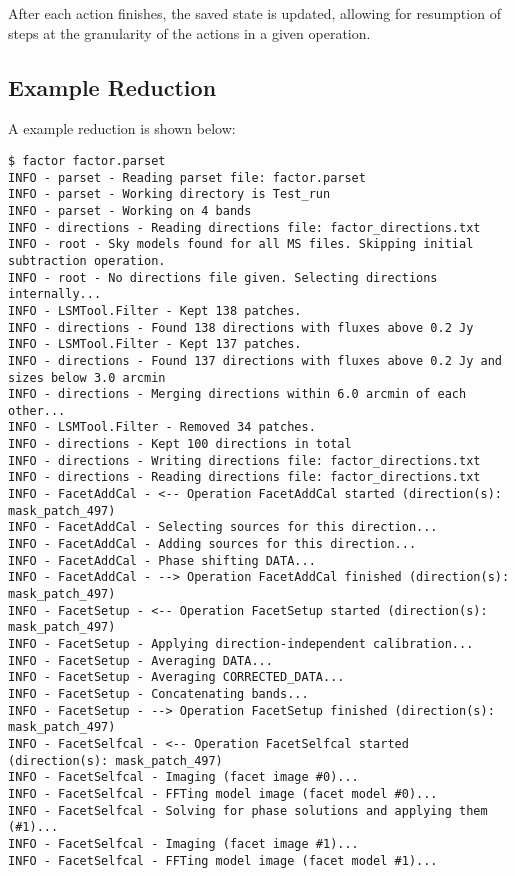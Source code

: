 \documentclass[structabstract]{article}
\begin{document}
{After each action finishes, the saved state is updated, allowing for resumption of steps at the granularity of the actions in a given operation.


\subsection{Example Reduction}
\label{factor:example}

A example reduction is shown below:

\begin{verbatim}
$ factor factor.parset
INFO - parset - Reading parset file: factor.parset
INFO - parset - Working directory is Test_run
INFO - parset - Working on 4 bands
INFO - directions - Reading directions file: factor_directions.txt
INFO - root - Sky models found for all MS files. Skipping initial subtraction operation.
INFO - root - No directions file given. Selecting directions internally...
INFO - LSMTool.Filter - Kept 138 patches.
INFO - directions - Found 138 directions with fluxes above 0.2 Jy
INFO - LSMTool.Filter - Kept 137 patches.
INFO - directions - Found 137 directions with fluxes above 0.2 Jy and sizes below 3.0 arcmin
INFO - directions - Merging directions within 6.0 arcmin of each other...
INFO - LSMTool.Filter - Removed 34 patches.
INFO - directions - Kept 100 directions in total
INFO - directions - Writing directions file: factor_directions.txt
INFO - directions - Reading directions file: factor_directions.txt
INFO - FacetAddCal - <-- Operation FacetAddCal started (direction(s): mask_patch_497)
INFO - FacetAddCal - Selecting sources for this direction...
INFO - FacetAddCal - Adding sources for this direction...
INFO - FacetAddCal - Phase shifting DATA...
INFO - FacetAddCal - --> Operation FacetAddCal finished (direction(s): mask_patch_497)
INFO - FacetSetup - <-- Operation FacetSetup started (direction(s): mask_patch_497)
INFO - FacetSetup - Applying direction-independent calibration...
INFO - FacetSetup - Averaging DATA...
INFO - FacetSetup - Averaging CORRECTED_DATA...
INFO - FacetSetup - Concatenating bands...
INFO - FacetSetup - --> Operation FacetSetup finished (direction(s): mask_patch_497)
INFO - FacetSelfcal - <-- Operation FacetSelfcal started (direction(s): mask_patch_497)
INFO - FacetSelfcal - Imaging (facet image #0)...
INFO - FacetSelfcal - FFTing model image (facet model #0)...
INFO - FacetSelfcal - Solving for phase solutions and applying them (#1)...
INFO - FacetSelfcal - Imaging (facet image #1)...
INFO - FacetSelfcal - FFTing model image (facet model #1)...

\end{verbatim}}
\end{document}
